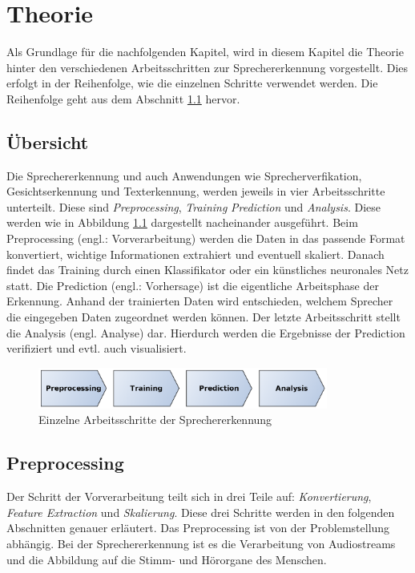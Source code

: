 \chapter{Theorie}
\label{cha:theorie}
Als Grundlage für die nachfolgenden Kapitel, wird in diesem Kapitel die Theorie hinter den verschiedenen Arbeitsschritten zur Sprechererkennung vorgestellt. Dies erfolgt in der Reihenfolge, wie die einzelnen Schritte verwendet werden. Die Reihenfolge geht aus dem Abschnitt \ref{sec:uebersicht} hervor.

\section{Übersicht}
\label{sec:uebersicht}
Die Sprechererkennung und auch Anwendungen wie Sprecherverfikation, Gesichtserkennung und Texterkennung, werden jeweils in vier Arbeitsschritte unterteilt. Diese sind \emph{Preprocessing}, \emph{Training} \emph{Prediction} und \emph{Analysis}. Diese werden wie in Abbildung \ref{fig:allgemeinerAblauf} dargestellt nacheinander ausgeführt. Beim Preprocessing (engl.: Vorverarbeitung) werden die Daten in das passende Format konvertiert, wichtige Informationen extrahiert und eventuell skaliert. Danach findet das Training durch einen Klassifikator oder ein künstliches neuronales Netz statt. Die Prediction (engl.: Vorhersage) ist die eigentliche Arbeitsphase der Erkennung. Anhand der trainierten Daten wird entschieden, welchem Sprecher die eingegeben Daten zugeordnet werden können. Der letzte Arbeitsschritt stellt die Analysis (engl. Analyse) dar. Hierdurch werden die Ergebnisse der Prediction verifiziert und evtl. auch visualisiert.

\begin{figure}[h]
  \centering
  \includegraphics[width=0.85\textwidth]{images/allgemeinerAblauf}
  \caption{Einzelne Arbeitsschritte der Sprechererkennung}
  \label{fig:allgemeinerAblauf}
\end{figure}

\section{Preprocessing}
Der Schritt der Vorverarbeitung teilt sich in drei Teile auf: \emph{Konvertierung}, \emph{Feature Extraction} und \emph{Skalierung}. Diese drei Schritte werden in den folgenden Abschnitten genauer erläutert. Das Preprocessing ist von der Problemstellung abhängig. Bei der Sprechererkennung ist es die Verarbeitung von Audiostreams und die Abbildung auf die Stimm- und Hörorgane des Menschen.

